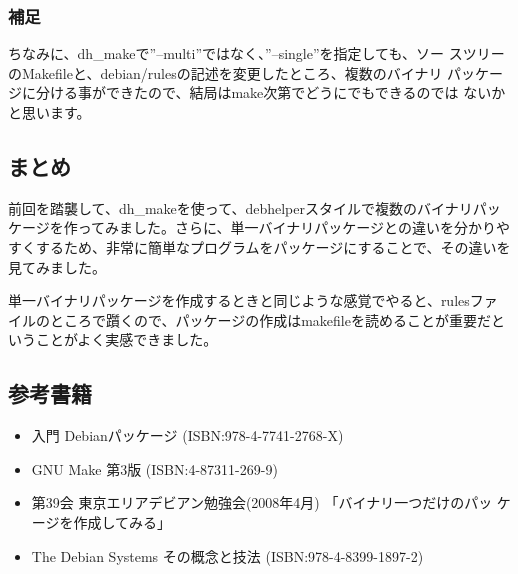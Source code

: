 \documentclass[mingoth,a4paper]{jsarticle}
\begin{document}
\subsubsection{補足}
ちなみに、dh\_makeで''--multi''ではなく、''--single''を指定しても、ソー
スツリーのMakefileと、debian/rulesの記述を変更したところ、複数のバイナリ
パッケージに分ける事ができたので、結局はmake次第でどうにでもできるのでは
ないかと思います。

\subsection{まとめ}
前回を踏襲して、dh\_makeを使って、debhelperスタイルで複数のバイナリパッ
ケージを作ってみました。さらに、単一バイナリパッケージとの違いを分かりや
すくするため、非常に簡単なプログラムをパッケージにすることで、その違いを
見てみました。

単一バイナリパッケージを作成するときと同じような感覚でやると、rulesファ
イルのところで躓くので、パッケージの作成はmakefileを読めることが重要だと
いうことがよく実感できました。


\subsection{参考書籍}
\begin{itemize}
 \item
      入門 Debianパッケージ (ISBN:978-4-7741-2768-X)
 \item
      GNU Make 第3版 (ISBN:4-87311-269-9)
 \item
      第39会 東京エリアデビアン勉強会(2008年4月) 「バイナリ一つだけのパッ
      ケージを作成してみる」
 \item
      The Debian Systems その概念と技法 (ISBN:978-4-8399-1897-2)
\end{itemize}


\newpage

\end{document}
